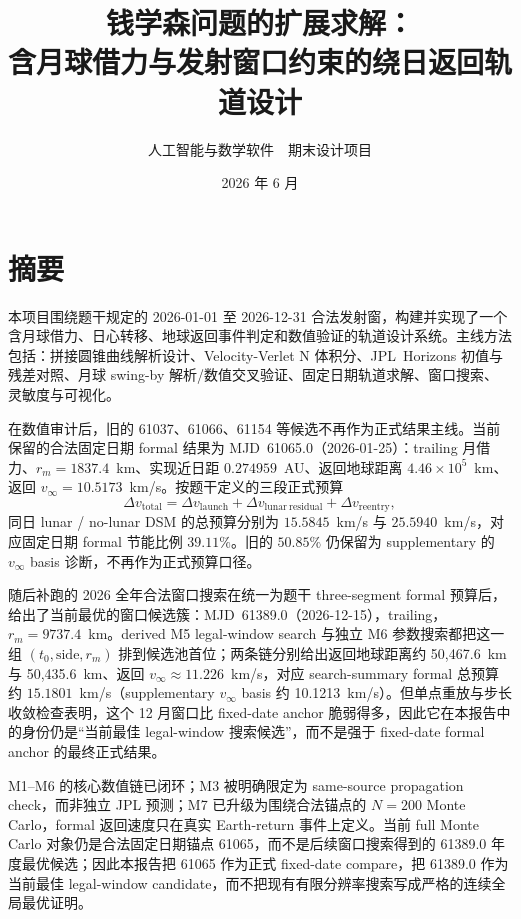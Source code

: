 \documentclass[12pt,a4paper]{ctexart}
\title{\textbf{钱学森问题的扩展求解：\\含月球借力与发射窗口约束的绕日返回轨道设计}}
\author{人工智能与数学软件~~期末设计项目}
\date{2026 年 6 月}
\begin{document}
\maketitle
\thispagestyle{empty}

\section{摘要}
本项目围绕题干规定的 2026-01-01 至 2026-12-31 合法发射窗，构建并实现了一个含月球借力、日心转移、地球返回事件判定和数值验证的轨道设计系统。主线方法包括：拼接圆锥曲线解析设计、Velocity-Verlet N 体积分、JPL~Horizons 初值与残差对照、月球 swing-by 解析/数值交叉验证、固定日期轨道求解、窗口搜索、灵敏度与可视化。

在数值审计后，旧的 61037、61066、61154 等候选不再作为正式结果主线。当前保留的合法固定日期 formal 结果为 MJD~61065.0（2026-01-25）：trailing 月借力、$r_m=1837.4$~km、实现近日距 $0.274959$~AU、返回地球距离 $4.46\times10^5$~km、返回 $v_{\infty}=10.5173$~km/s。按题干定义的三段正式预算
\[
\Delta v_{\mathrm{total}}=\Delta v_{\mathrm{launch}}+\Delta v_{\mathrm{lunar\ residual}}+\Delta v_{\mathrm{reentry}},
\]
同日 lunar / no-lunar DSM 的总预算分别为 $15.5845$~km/s 与 $25.5940$~km/s，对应固定日期 formal 节能比例 $39.11\%$。旧的 $50.85\%$ 仍保留为 supplementary 的 $v_{\infty}$ basis 诊断，不再作为正式预算口径。

随后补跑的 2026 全年合法窗口搜索在统一为题干 three-segment formal 预算后，给出了当前最优的窗口候选簇：MJD~61389.0（2026-12-15），trailing，$r_m=9737.4$~km。derived M5 legal-window search 与独立 M6 参数搜索都把这一组 $(t_0,\mathrm{side},r_m)$ 排到候选池首位；两条链分别给出返回地球距离约 50,467.6~km 与 50,435.6~km、返回 $v_{\infty}\approx 11.226$~km/s，对应 search-summary formal 总预算约 $15.1801$~km/s（supplementary $v_{\infty}$ basis 约 10.1213~km/s）。但单点重放与步长收敛检查表明，这个 12 月窗口比 fixed-date anchor 脆弱得多，因此它在本报告中的身份仍是“当前最佳 legal-window 搜索候选”，而不是强于 fixed-date formal anchor 的最终正式结果。

M1--M6 的核心数值链已闭环；M3 被明确限定为 same-source propagation check，而非独立 JPL 预测；M7 已升级为围绕合法锚点的 $N=200$ Monte Carlo，formal 返回速度只在真实 Earth-return 事件上定义。当前 full Monte Carlo 对象仍是合法固定日期锚点 61065，而不是后续窗口搜索得到的 61389.0 年度最优候选；因此本报告把 61065 作为正式 fixed-date compare，把 61389.0 作为当前最佳 legal-window candidate，而不把现有有限分辨率搜索写成严格的连续全局最优证明。

\newpage
\end{document}
